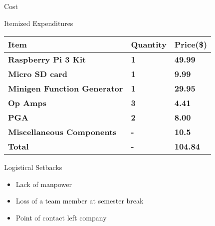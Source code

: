 \begin{frame}{Cost}
\begin{block}{Itemized Expenditures}
  \begin{center}
    \begin{tabularx}{1.0\textwidth}{|X|X|X|}
        \hline

        \textbf{Item} &
        \textbf{Quantity} &
        \textbf{Price(\$)} \\
        \hline

        \textbf{Raspberry Pi 3 Kit} &
        \textbf{1} &
        \textbf{49.99} \\
        \hline

        \textbf{Micro SD card} &
        \textbf{1} &
        \textbf{9.99} \\
        \hline

        \textbf{Minigen Function Generator} &
        \textbf{1} &
        \textbf{29.95} \\
        \hline

        \textbf{Op Amps} &
        \textbf{3} &
        \textbf{4.41} \\
        \hline

        \textbf{PGA} &
        \textbf{2} &
        \textbf{8.00} \\
        \hline

        \textbf{Miscellaneous Components} &
        \textbf{-} &
        \textbf{10.5} \\
        \hline

        \hline
        \textbf{Total} &
        \textbf{-} &
        \textbf{104.84} \\

        \hline
    \end{tabularx}
  \end{center}
\end{block}
\end{frame}

\begin{frame}{Logistical Setbacks}
\begin{block}{}
  \begin{itemize}
    \item Lack of manpower
    \item Loss of a team member at semester break
    \item Point of contact left company
  \end{itemize}
\end{block}
\end{frame}

